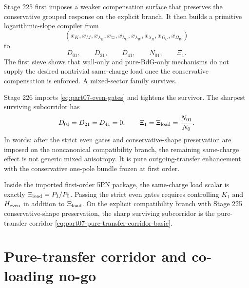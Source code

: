 Stage 225 first imposes a weaker compensation surface that preserves the conservative grouped response on the explicit branch.  It then builds a primitive logarithmic-slope compiler from
\begin{equation}
\label{eq:part07-primitive-log-slopes}
(x_K,x_M,x_{\lambda_B},x_{\varpi},x_{\lambda_U},x_{\lambda_W},x_{\lambda_R},x_{\Omega_U},x_{\Omega_W})
\end{equation}
to
\begin{equation}
\label{eq:part07-primitive-compiler-output}
D_{01},
\qquad
D_{21},
\qquad
D_{41},
\qquad
N_{01},
\qquad
\Xi_1.
\end{equation}
The first sieve shows that wall-only and pure-BdG-only mechanisms do not supply the desired nontrivial same-charge load once the conservative compensation is enforced.  A mixed-sector family survives.

Stage 226 imports \cref{eq:part07-even-gates} and tightens the survivor.  The sharpest surviving subcorridor has
\begin{equation}
\label{eq:part07-pure-transfer-corridor-basic}
D_{01}=D_{21}=D_{41}=0,
\qquad
\Xi_1=\Xi_{\rm load}=\frac{N_{01}}{N_0}.
\end{equation}
In words: after the strict even gates and conservative-shape preservation are imposed on the noncanonical compatibility branch, the remaining same-charge effect is not generic mixed anisotropy.  It is pure outgoing-transfer enhancement with the conservative one-pole bundle frozen at first order.

\begin{theorem}
\label{thm:part07-strict-even-package}
Inside the imported first-order 5PN package, the same-charge load scalar is exactly \(\Xi_{\rm load}=P_1/P_0\).  Passing the strict even gates requires controlling \(K_1\) and \(H_{\rm even}\) in addition to \(\Xi_{\rm load}\).  On the explicit compatibility branch with Stage 225 conservative-shape preservation, the sharp surviving subcorridor is the pure-transfer corridor \cref{eq:part07-pure-transfer-corridor-basic}.
\end{theorem}


\section{Pure-transfer corridor and co-loading no-go}
\label{sec:part07_same_charge_rigid_mouth:pure-transfer-corridor-and-co-loading-no-go}

